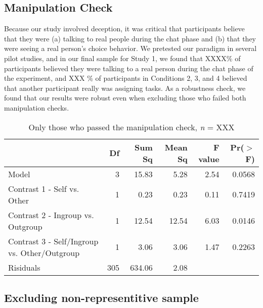 \documentclass[12pt,]{article}
\begin{document}

\newpage
\subsection{Manipulation Check}
\label{appendix:manip1}

Because our study involved deception, it was critical that participants believe that they were (a) talking to real people during the chat phase and (b) that they were seeing a real person's choice behavior. We pretested our paradigm in several pilot studies, and in our final sample for Study 1, we found that  XXXX\% of participants believed they were talking to a real person during the chat phase of the experiment, and XXX \% of participants in Conditions 2, 3, and 4 believed that another participant really was assigning tasks. As a robustness check, we found that our results were robust even when excluding those who failed both manipulation checks. 

\vspace{0.6cm}

\begin{table}[ht]
\centering
\begin{tabular}{lrrrrr}
  \hline
 & Df & Sum Sq & Mean Sq & F value & Pr($>$F) \\ 
  \hline
Model & 3 & 15.83 & 5.28 & 2.54 & 0.0568 \\ 
  Contrast 1 - Self vs. Other & 1 & 0.23 & 0.23 & 0.11 & 0.7419 \\ 
  Contrast 2 - Ingroup vs. Outgroup & 1 & 12.54 & 12.54 & 6.03 & 0.0146 \\ 
  Contrast 3 - Self/Ingroup vs. Other/Outgroup & 1 & 3.06 & 3.06 & 1.47 & 0.2263 \\ 
  Risiduals & 305 & 634.06 & 2.08 &  &  \\ 
   \hline
\end{tabular}
\caption{{\color{red}{INCOMPLETE}}Only those who passed the manipulation check, \emph{n} = XXX} 
\label{manip1}
\end{table}


\newpage
\subsection{Excluding non-representitive sample}
\label{appendix:manip1}





\end{document}
